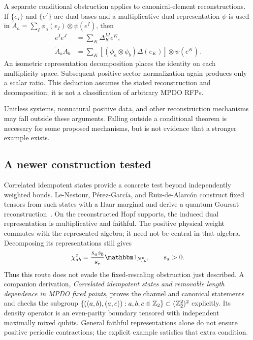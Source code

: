 A separate conditional obstruction applies to canonical-element
reconstructions. If $\{e_I\}$ and $\{e^I\}$ are dual bases and a
multiplicative dual representation $\psi$ is used in
$\widetilde A_a=\sum_I\phi_a(e_I)\otimes\psi(e^I)$, then
\begin{align}
	e^Ie^J & =\sum_K\Delta_K^{IJ}e^K,                  \\
	\widetilde A_a\widetilde A_b
	       & =\sum_K[(\phi_a\otimes\phi_b)\Delta(e_K)]
	\otimes\psi(e^K).
\end{align}
An isometric representation decomposition places the identity on
each multiplicity space. Subsequent positive sector normalization
again produces only a scalar ratio. This deduction assumes the
stated reconstruction and decomposition; it is not a classification
of arbitrary MPDO RFPs.

Unitless systems, nonnatural positive data, and other reconstruction
mechanisms may fall outside these arguments. Falling outside a
conditional theorem is necessary for some proposed mechanisms, but
is not evidence that a stronger example exists.

\subsection{A newer construction tested}

Correlated idempotent states provide a concrete test beyond independently
weighted bonds. Le-Nestour, P\'erez-Garc\'ia, and Ruiz-de-Alarc\'on
construct fixed tensors from such states with a Haar marginal and derive
a quantum Goursat reconstruction~\cite{Goursat}. On the reconstructed
Hopf supports, the induced dual representation is multiplicative and
faithful. The positive physical weight commutes with the represented
algebra; it need not be central in that algebra. Decomposing its
representations still gives
\begin{align}
 \chi_{ab}^{c}=\frac{s_as_b}{s_c}\Id_{N_{ab}^{c}},\qquad s_a>0.
\end{align}
Thus this route does not evade the fixed-rescaling obstruction just
described. A companion derivation, \emph{Correlated idempotent states and
removable length dependence in MPDO fixed points}, proves the channel and
canonical statements and checks the subgroup
$\{((a,b),(a,c)):a,b,c\in\mathbb{Z}_2\}\subset(\mathbb{Z}_2^2)^2$ explicitly.
Its density operator is an even-parity boundary tensored with independent
maximally mixed qubits. General faithful representations alone do not
ensure positive periodic contractions; the explicit example satisfies
that extra condition.

